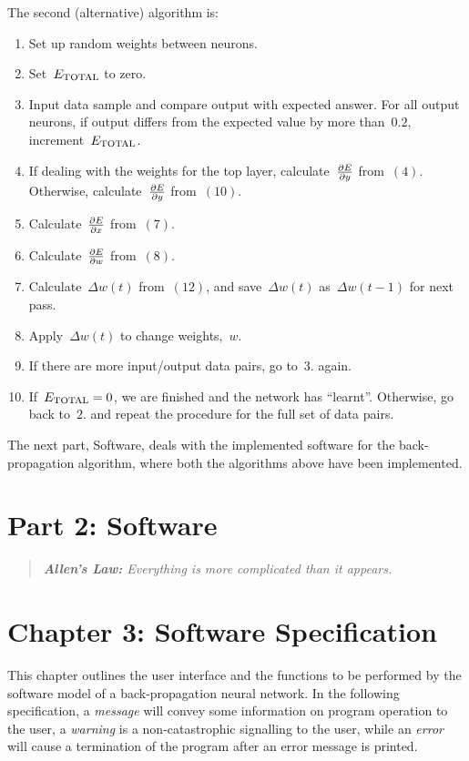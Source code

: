 \documentclass[12pt]{report}
\begin{document}
The second (alternative) algorithm is:

\begin{enumerate}
\item Set up random weights between neurons.
\item Set~$E_{\rm TOTAL}$ to zero.
\item Input data sample and compare output with expected answer.
For all output neurons, if output differs from the expected value by
more than~$0.2$, increment~$E_{\rm TOTAL}$.
\item If dealing with the weights for the top layer,
calculate~$\partial E \over \partial y$ from~$(4)$. Otherwise,
calculate~$\partial E \over \partial y$ from~$(10)$.
\item Calculate~$\partial E \over \partial x$ from~$(7)$.
\item Calculate~$\partial E \over \partial w$ from~$(8)$.
\item Calculate~$\Delta w(t)$ from~$(12)$, and save~$\Delta
w(t)$ as~$\Delta w(t-1)$ for next pass.
\item Apply~$\Delta w(t)$ to change weights,~$w$.
\item If there are more input/output data pairs, go to~$3.$
again.
\item If~$E_{\rm TOTAL} = 0$, we are finished and the network
has ``learnt''.
Otherwise, go back to~$2.$ and repeat the procedure for the full set
of data pairs.
\end{enumerate}

The next part, Software, deals with the implemented software for the
back-propagation algorithm, where both the algorithms above have
been implemented.

\chapter*{Part 2: Software}

\begin{quote}\textit{\textbf{Allen's Law:} Everything is more complicated
than it appears.}\end{quote}

\chapter{Chapter 3: Software Specification}

This chapter outlines the user interface and the functions to be performed
by the software model of a back-propagation neural network.
In the following specification, a {\sl message\/} will convey some
information on program operation to the user, a {\sl warning\/} is a
non-catastrophic signalling to the user, while an {\sl error\/} will
cause a termination of the program after an error message is printed.
\end{document}
